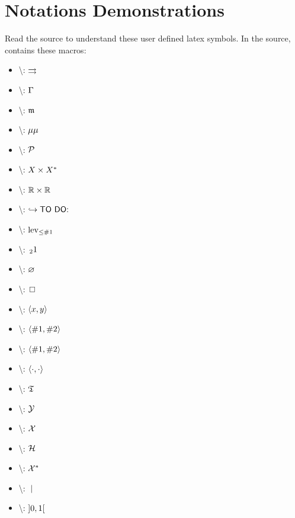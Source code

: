 \section{Notations Demonstrations}
    Read the source to understand these user defined latex symbols. 
    In the source,  contains these macros: 
    \begin{itemize}
        \item \textbackslash{}: $\To$
        \item \textbackslash{}: $\GX$ 
        \item \textbackslash{}: $\mal$
        \item \textbackslash{}: $\mumu$
        \item \textbackslash{}: $\paver$
        \item \textbackslash{}: $\ZZZ$
        \item \textbackslash{}: $\RRR$
        \item \textbackslash{}: $\todo$
        \item \textbackslash{}: $\lev{\#1}$
        \item \textbackslash{}: $\moyo{1}{2}$
        \item \textbackslash{}: $\emp$
        \item \textbackslash{}: $\infconv$
        \item \textbackslash{}: $\pair{x}{y}$
        \item \textbackslash{}: $\scal{\#1}{\#2}$
        \item \textbackslash{}: $\Scal{\#1}{\#2}$
        \item \textbackslash{}: $\pscal$
        \item \textbackslash{}: $\Tt$
        \item \textbackslash{}: $\YY$
        \item \textbackslash{}: $\XX$
        \item \textbackslash{}: $\HH$
        \item \textbackslash{}: $\XP$
        \item \textbackslash{}: $\st$
        \item \textbackslash{}: $\zeroun$
        
    \end{itemize}